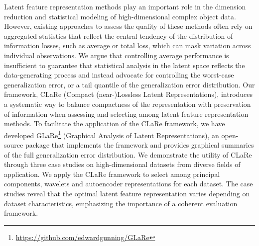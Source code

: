 Latent feature representation methods play an important role in the dimension reduction and statistical modeling of high-dimensional complex object data.
However, existing approaches to assess the quality of these methods often rely on aggregated statistics that reflect the central tendency of the distribution of information losses, such as average or total loss, which can mask variation across individual observations.
We argue that controlling average performance is insufficient to guarantee that statistical analysis in the latent space reflects the data-generating process and instead advocate for controlling the worst-case generalization error, or a tail quantile of the generalization error distribution.
Our framework, CLaRe (Compact (near-)Lossless Latent Representations), introduces a systematic way to balance compactness of the representation with preservation of information when assessing and selecting among latent feature representation methods. 
To facilitate the application of the CLaRe framework, we have developed GLaRe\footnote{\url{https://github.com/edwardgunning/GLaRe}} (Graphical Analysis of Latent Representations), an open-source  package that implements the framework and provides graphical summaries of the full generalization error distribution.
We demonstrate the utility of CLaRe through three case studies on high-dimensional datasets from diverse fields of application.
We apply the CLaRe framework to select among principal components, wavelets and autoencoder representations for each dataset.
The case studies reveal that the optimal latent feature representation varies depending on dataset characteristics, emphasizing the importance of a coherent evaluation framework.